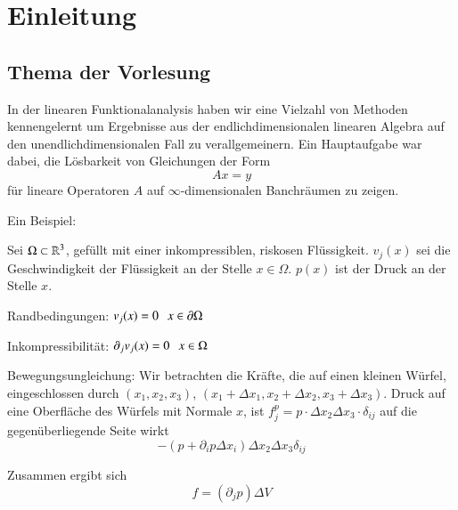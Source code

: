 \chapter{Einleitung}

\section{Thema der Vorlesung}

In der linearen Funktionalanalysis haben wir eine Vielzahl von Methoden kennengelernt um
Ergebnisse aus der endlichdimensionalen linearen Algebra auf den unendlichdimensionalen Fall 
zu verallgemeinern. Ein Hauptaufgabe war dabei, die Lösbarkeit von Gleichungen der Form
\[
    Ax=y
\]
für lineare Operatoren $A$ auf $\infty$-dimensionalen Banchräumen zu zeigen.
\begin{description}
    \item{Ein Beispiel:}
    
    Sei $\Omega\subset\mathbb{R}^3$, gefüllt mit einer inkompressiblen, riskosen Flüssigkeit.
    $v_j(x)$ sei die Geschwindigkeit der Flüssigkeit an der Stelle $x\in \Omega$. 
    $p(x)$ ist der Druck an der Stelle $x$.
    \begin{description}
    \item{Randbedingungen:}
    $v_j(x)=0 \hspace{.25cm} x\in \partial\Omega$
    \item{Inkompressibilität:}
    $\partial_jv_j(x)=0 \hspace{.25cm} x\in \Omega$
    \item{Bewegungsungleichung:}
    Wir betrachten die Kräfte, die auf einen kleinen Würfel, eingeschlossen durch
    $(x_1,x_2,x_3)$, $(x_1+\Delta x_1, x_2+\Delta x_2, x_3+\Delta x_3)$. Druck auf eine Oberfläche
    des Würfels mit Normale $x$, ist $f_j^p=p\cdot \Delta x_2 \Delta x_3 \cdot \delta_{ij} $ auf die
    gegenüberliegende Seite wirkt
    \[
        -(p+\partial _i p \Delta x_i) \Delta x_2 \Delta x_3 \delta_{ij}
    \]
    \end{description}
Zusammen ergibt sich 
\[
    f=(\partial_j p)\Delta V
\]


\end{description}

